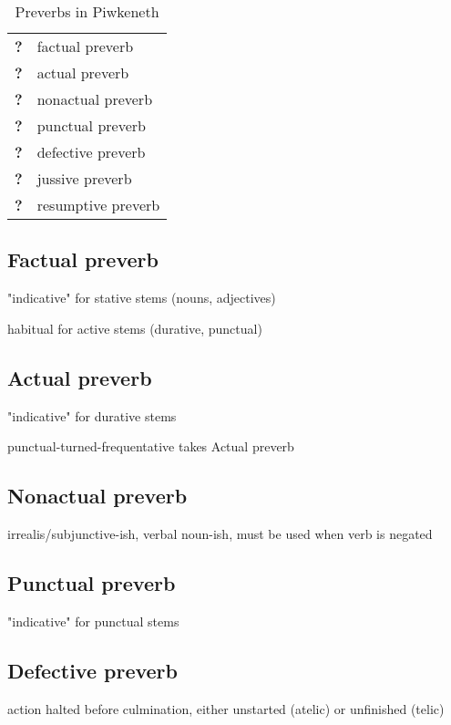 \documentclass[executivepaper,10pt,twoside,openany,draft]{memoir}
\newcommand{\lang}{Piwkeneth}
\begin{document}
\begin{table}[ht]
    \centering
    \begin{tabular}{>{\bfseries}ll}
        \toprule
        ? & factual preverb \\
        ? & actual preverb \\
        ? & nonactual preverb \\
        ? & punctual preverb \\
        ? & defective preverb \\
        ? & jussive preverb \\
        ? & resumptive preverb \\
        \bottomrule
    \end{tabular}
    \caption{Preverbs in \lang}
\end{table}

\subsection{Factual preverb}

"indicative" for stative stems (nouns, adjectives)

habitual for active stems (durative, punctual)

\subsection{Actual preverb}

"indicative" for durative stems

punctual-turned-frequentative takes Actual preverb

\subsection{Nonactual preverb}

irrealis/subjunctive-ish, verbal noun-ish, must be used when verb is negated

\subsection{Punctual preverb}

"indicative" for punctual stems

\subsection{Defective preverb}

action halted before culmination, either unstarted (atelic) or unfinished (telic)
\end{document}
